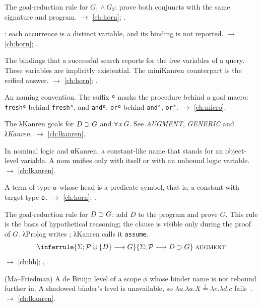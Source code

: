 \begin{glossarylist}
\item[AND] The goal-reduction rule for $G_1\wedge G_2$: prove both conjuncts with the same signature and program.
  $\rightarrow$ \cref{ch:horn}; .
\item[Anonymous variable] \lp{_}: each occurrence is a distinct variable, and its binding is not reported.
  $\rightarrow$ \cref{ch:horn}; .
\item[Answer substitution] The bindings that a successful search reports for the free variables of a query. These
  variables are implicitly existential. The miniKanren counterpart is the reified answer.
  $\rightarrow$ \cref{ch:horn}; .
\item[Applicative form] An \aux{} naming convention. The suffix \texttt{ª} marks the procedure behind a goal macro:
  \texttt{freshª} behind \texttt{fresh°}, and \texttt{andª}, \texttt{orª} behind \texttt{and°}, \texttt{or°}.
  $\rightarrow$ \cref{ch:micro}.
\item[\texttt{assume}, \texttt{all}] The λKanren goals for $D\supset G$ and $\forall x\,G$. See \emph{AUGMENT},
  \emph{GENERIC} and \emph{λKanren}. $\rightarrow$ \cref{ch:lkanren}.
\item[Atom (nominal), nom, name] In nominal logic and αKanren, a constant-like name that stands for an
  object-level variable. A nom unifies only with itself or with an unbound logic variable.
  $\rightarrow$ \cref{ch:lkanren}.
\item[Atomic formula] A term of type $\mathsf{o}$ whose head is a predicate symbol, that is, a constant with target
  type $\mathsf{o}$. $\rightarrow$ \cref{ch:horn}; .
\item[AUGMENT] The goal-reduction rule for $D\supset G$: add $D$ to the program and prove $G$. This rule is the basis
  of hypothetical reasoning; the clause is visible only during the proof of $G$. λProlog writes ;
  λKanren calls it \texttt{assume}.
  \[\inferrule{\seq{\Sig}{\Prog\cup\{D\}}{G}}{\seq{\Sig}{\Prog}{D\imp G}}\;\rulename{augment}\]
  $\rightarrow$ \cref{ch:hh}; , .
\item[Available level] (Ma--Friedman) A de Bruijn level of a scope $\phi$ whose binder name is not rebound further
  in. A shadowed binder's level is unavailable, so $\lambda a.\lambda a.X \stackrel{?}{=} \lambda c.\lambda d.c$
  fails~\cite{MaFriedman2021}. $\rightarrow$ \cref{ch:lkanren}.
\end{glossarylist}

